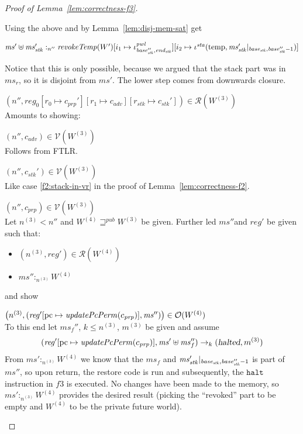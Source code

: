 \documentclass[a4paper]{article}
\newcommand{\update}[2]{[#1 \mapsto #2]}
\newcommand{\var}[1]{\mathit{#1}}
\newcommand{\hs}{\var{ms}}
\newcommand{\ms}{\hs}
\newcommand{\pcreg}{\mathrm{pc}}
\newcommand{\start}{\var{base}}
\newcommand{\addrend}{\var{end}}
\newcommand{\reg}{\var{reg}}
\newcommand{\heap}{\var{mem}}
\newcommand{\adv}{\var{adv}}
\newcommand{\stk}{\var{stk}}
\newcommand{\pwl}{\var{pwl}}
\newcommand{\sta}{\var{sta}}
\newcommand{\halted}{\textsl{halted}}
\newcommand{\plainfun}[2]{
  \ifthenelse{\equal{#2}{}}
  {\mathit{#1}}
  {\mathit{#1}(#2)}
}
\newcommand{\updatePcPerm}[1]{\plainfun{updatePcPerm}{#1}}
\newcommand{\revokeTemp}[1]{\plainfun{revokeTemp}{#1}}
\newcommand{\futurewk}{\mathbin{\sqsupseteq}^{\var{pub}}}
\newcommand{\heapSat}[3][\heap]{#1 :_{#2} #3}
\newcommand{\memSat}[3][n]{\heapSat[#2]{#1}{#3}}
\newcommand{\asmType}{\plaindom{AsmType}}
\newcommand{\plaindom}[1]{\mathrm{#1}}
\newcommand{\intr}[2]{\mathcal{#1}}
\newcommand{\valueintr}[1]{\intr{V}{#1}}
\newcommand{\regintr}[1]{\intr{R}{#1}}
\newcommand{\stdvr}{\valueintr{\asmType}}
\newcommand{\stdrr}{\regintr{\asmType}}
\newcommand{\observations}{\mathcal{O}}
\newcommand{\npair}[2][n]{\left(#1,#2 \right)}
\newcommand{\plainview}[1]{\mathrm{#1}}
\newcommand{\temp}{\plainview{temp}}
\newcommand{\step}[1][]{\rightarrow_{#1}}
\begin{document}
\begin{proof}[Proof of Lemma~\ref{lem:correctness-f3}]
\begin{enumproof}[start=3]
\begin{enumproof}[start=3]
\begin{enumproof}[resume]
        Using the above and \label{f3:perm-mem-sat} by Lemma~\ref{lem:disj-mem-sat} get
        \begin{enumproof}
        \item $\memSat[n'']{\ms' \uplus \ms_\stk'}{\revokeTemp{W'}\update{i_1}{\iota^\pwl_{\base_\stk'',\addrend_\stk}}\update{i_2}{\iota^\sta (\temp,\ms_\stk' |_{\start_\stk,\base_\stk''-1})}}$ 
        \end{enumproof}
        Notice that this is only possible, because we argued that the stack part was in $\ms_r$, so it is disjoint from $\ms'$. The lower step comes from downwards closure.
      \item $\npair[n'']{\reg_0\update{r_0}{c_{\var{prp}}'}\update{r_1}{c_\adv}\update{r_\stk}{c_\stk'}} \in \stdrr(W^{(3)})$ \\
        Amounts to showing:
        \begin{enumproof}
        \item $\npair[n'']{c_\adv} \in \stdvr(W^{(3)})$\\
          Follows from FTLR.
        \item $\npair[n'']{c_\stk'} \in \stdvr(W^{(3)})$\\
          Like case \ref{f2:stack-in-vr} in the proof of Lemma~\ref{lem:correctness-f2}.
        \item $\npair[n'']{c_{\var{prp}}} \in \stdvr(W^{(3)})$\\
          Let $n^{(3)} < n''$ and $W^{(4)} \futurewk W^{(3)}$ be given. Further led $\ms''$and $\reg'$ be given such that:
          \begin{itemize}
          \item $\npair[n^{(3)}]{\reg'} \in \stdrr(W^{(4)})$
          \item $\memSat[n^{(3)}]{\ms''}{W^{(4)}}$
          \end{itemize}
          and show
          \begin{enumproof}
          \item $\npair[n^{(3)}]{(\reg'\update{\pcreg}{\updatePcPerm{c_{\var{prp}}}},\ms'')} \in \observations(W^{(4)})$\\
            To this end let $\ms_f''$, $k \leq n^{(3)}$, $m^{(3)}$ be given and assume
            \[
              (\reg'\update{\pcreg}{\updatePcPerm{c_{\var{prp}}}},\ms' \uplus \ms_f'') \step[k] (\halted,m^{(3)})
            \]
            From $\memSat[n^{(3)}]{\ms'}{W^{(4)}}$ we know that the $\ms_f$ and $\ms_\stk' |_{\base_\stk,\base_\stk''-1}$ is part of $\ms''$, so upon return, the restore code is run and subsequently, the $\mathtt{halt}$ instruction in $f3$ is executed. No changes have been made to the memory, so $\memSat[n^{(3)}]{\ms'}{W^{(4)}}$ provides the desired result (picking the ``revoked'' part to be empty and $W^{(4)}$ to be the private future world). 

\end{enumproof}
\end{enumproof}
\end{enumproof}
\end{enumproof}
\end{enumproof}
\end{proof}
\end{document}
